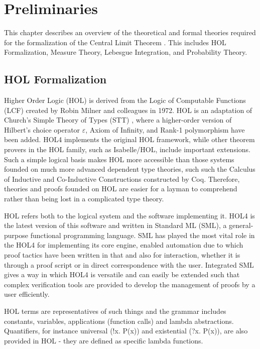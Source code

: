 \chapter[Preliminaries]{Preliminaries}
\label{chap:3}

This chapter describes an overview of the theoretical and formal theories required for the formalization of the Central Limit Theorem . This includes HOL Formalization, Measure Theory, Lebesgue Integration, and Probability Theory.
\section{HOL Formalization}
Higher Order Logic (HOL) \cite{hol4, slind2008brief} is derived from the Logic of Computable Functions (LCF) \cite{gordon1979edinburgh, milner1972logic} created by Robin Milner and colleagues in 1972. HOL is an adaptation of Church's Simple Theory of Types (STT) \cite{church1940formulation}, where a higher-order version of Hilbert's choice operator \(\varepsilon \), Axiom of Infinity, and Rank-1 polymorphism have been added. HOL4 implements the original HOL framework, while other theorem provers in the HOL family, such as Isabelle/HOL, include important extensions. Such a simple logical basis makes HOL more accessible than those systems founded on much more advanced dependent type theories, such such the Calculus of Inductive and Co-Inductive Constructions constructed by Coq. Therefore, theories and proofs founded on HOL are easier for a layman to comprehend rather than being lost in a complicated type theory.

HOL refers both to the logical system and the software implementing it. HOL4 is the latest version of this software and written in Standard ML (SML), a general-purpose functional programming language.  SML has played the most vital role in the HOL4 for implementing its core engine, enabled automation due to which proof tactics have been written in that and also for interaction, whether it is through a proof script or in direct correspondence with the user. Integrated SML gives a way in which HOL4 is versatile and can easily be extended such that complex verification tools are provided to develop the management of proofs by a user efficiently.

HOL terms are representatives of such things and the grammar includes constants, variables, applications (function calls) and lambda abstractions. Quantifiers, for instance universal (!x. P(x)) and existential (?x. P(x)), are also provided in HOL - they are defined as specific lambda functions.

